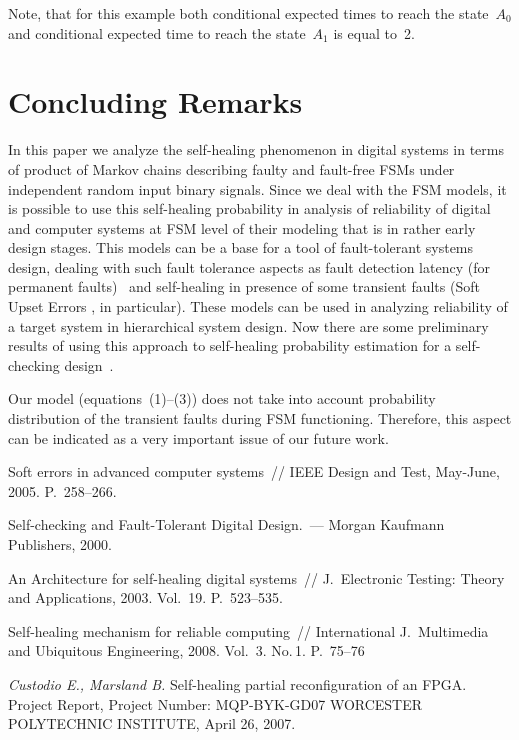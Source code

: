 \begin{multicols}{2}
Note, that for this example both conditional expected times to reach the state~$A_0$ 
and conditional expected time to reach the state~$A_1$  is equal to~2.

\section{Concluding Remarks}

In this paper we analyze the self-healing phenomenon in
digital systems in terms of product of Markov chains
describing faulty and fault-free FSMs under independent
random input binary signals.
Since we deal with the FSM models, it is possible to use
this self-healing probability in analysis of  reliability
of digital and computer systems at FSM level of their
modeling that is in rather early design stages.
This models can be a base for a tool of fault-tolerant
systems design, dealing with such fault tolerance aspects
as fault detection latency (for permanent faults)~\cite{8fr}
and self-healing in presence of some transient faults
(Soft Upset Errors , in particular).
These models can be used in analyzing reliability of a
target system in hierarchical system design.
Now there are some preliminary results of using this
approach to self-healing probability estimation for a
self-checking design~\cite{6fr}.

Our model (equations~(1)--(3)) does not take into account probability
distribution of the transient faults during FSM functioning.
Therefore, this aspect can be indicated as a very important issue
of our future work.

{\small\frenchspacing
{%
\begin{thebibliography}{9}
Soft errors in advanced computer systems~//
IEEE Design and Test, May-June, 2005. P.~258--266.

Self-checking and Fault-Tolerant Digital  Design.~---
Morgan Kaufmann Publishers, 2000.

An Architecture for self-healing digital systems~//
J.\ Electronic Testing: Theory and Applications, 2003.
Vol.~19. P.~523--535.

Self-healing mechanism for reliable computing~//
International J.\ Multimedia and Ubiquitous Engineering,
2008. Vol.~3. No.\,1. P.~75--76

{\it Custodio E., Marsland B.}
Self-healing partial reconfiguration of an FPGA.
Project Report, Project Number: MQP-BYK-GD07
WORCESTER POLYTECHNIC INSTITUTE, April 26, 2007.


\end{thebibliography}}}
\end{multicols}
